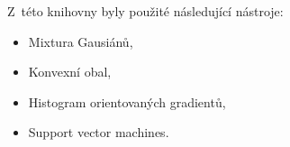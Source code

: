 
Z~této knihovny byly použité následující nástroje:

\begin{itemize}
  \item{Mixtura Gausiánů,}
  \item{Konvexní obal,}
  \item{Histogram orientovaných gradientů,}
  \item{Support vector machines.}
\end{itemize}